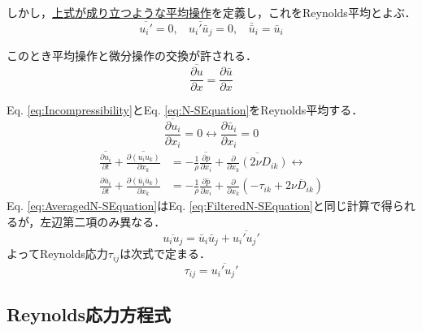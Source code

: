 \documentclass[12pt,a4paper]{jsarticle}
\begin{document}
しかし，\underline{上式が成り立つような平均操作}を定義し，これをReynolds平均とよぶ．
\begin{equation}
  \overline{u_i'} = 0, ~~~~ \overline{u_i' \bar{u}_j} = 0, ~~~~ \bar{\bar{u}}_i = \bar{u}_i \tag{6.2}
  \label{eq:CharacteristicsofReynoldsAverage}
\end{equation}

このとき平均操作と微分操作の交換が許される．
\begin{equation}
  \overline{ \frac{\partial u}{\partial x} } = \frac{\partial \bar{u}}{\partial x}
  \label{eq:ExchangeofAverageDerivative}
\end{equation}


Eq. \ref{eq:Incompressibility}とEq. \ref{eq:N-SEquation}をReynolds平均する．
\begin{equation}
  \overline{\frac{\partial u_i}{\partial x_i}} = 0 \leftrightarrow \frac{\partial \bar{u}_i}{\partial x_i} = 0 \tag{6.4}
  \label{eq:AveragedIncompressibility}
\end{equation}
\begin{align}
  \overline{\frac{\partial u_i}{\partial t}} +\overline{\frac{\partial (u_i u_k)}{\partial x_k}} &= -\frac{1}{\rho} \overline{\frac{\partial p}{\partial x_i}} +\overline{\frac{\partial}{\partial x_k} (2 \nu D_{ik})} \leftrightarrow \nonumber \\
  \frac{\partial \bar{u}_i}{\partial t} +\frac{\partial (\bar{u}_i \bar{u}_k)}{\partial x_k} &= -\frac{1}{\rho} \frac{\partial \bar{p}}{\partial x_i} +\frac{\partial}{\partial x_k} (-\tau_{ik} +2 \nu \overline{D}_{ik}) \tag{6.6}
\label{eq:AveragedN-SEquation}
\end{align}
%
Eq. \ref{eq:AveragedN-SEquation}はEq. \ref{eq:FilteredN-SEquation}と同じ計算で得られるが，左辺第二項のみ異なる．
\begin{equation}
  \overline{u_i u_j} = \bar{u}_i \bar{u}_j +\overline{u_i' u_j'} \tag{6.8}
  \label{eq:NonlinearTermofReynoldsAverage}
\end{equation}
%
よってReynolds応力$\tau_{ij}$は次式で定まる．
\begin{equation}
  \tau_{ij} = \overline{u_i' u_j'} \tag{6.9}
  \label{eq:ReynoldsStress}
\end{equation}


\subsection{Reynolds応力方程式}
\label{subsec:ReynoldsStressEquation}
\end{document}
